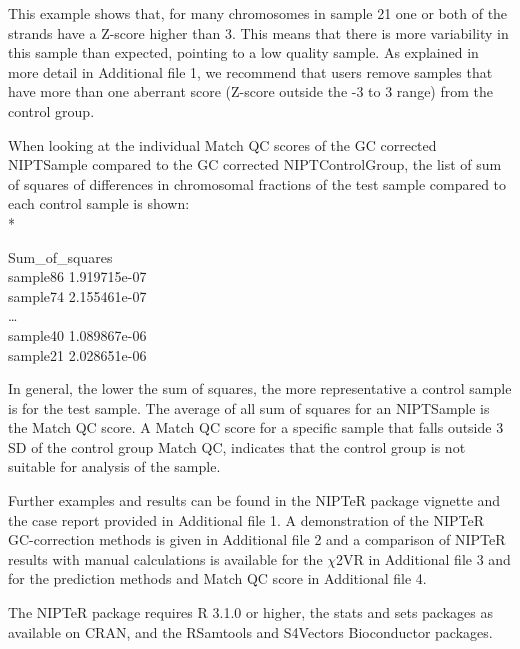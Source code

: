 This example shows that, for many chromosomes in sample 21 one or both of the strands have a Z-score higher than 3. 
This means that there is more variability in this sample than expected, pointing to a low quality sample. 
As explained in more detail in Additional file 1, we recommend that users remove samples that have more than one aberrant score (Z-score outside the -3 to 3 range) from the control group.

When looking at the individual Match QC scores of the GC corrected NIPTSample compared to the GC corrected NIPTControlGroup, the list of sum of squares of differences in chromosomal fractions of the test sample compared to each control sample is shown: \\*


\selectfont %
\footnotesize %
\noindent \hspace{16mm} Sum\_of\_squares \\
sample86 \hspace{1mm} 1.919715e-07 \\
sample74 \hspace{1mm} 2.155461e-07 \\
… \\
sample40 \hspace{1mm} 1.089867e-06 \\
sample21 \hspace{1mm} 2.028651e-06 \\
\selectfont %
\normalsize %


In general, the lower the sum of squares, the more representative a control sample is for the test sample. 
The average of all sum of squares for an NIPTSample is the Match QC score. 
A Match QC score for a specific sample that falls outside 3 SD of the control group Match QC, indicates that the control group is not suitable for analysis of the sample.

Further examples and results can be found in the NIPTeR package vignette \cite{Johansson_2016} and the case report provided in Additional file 1. 
A demonstration of the NIPTeR GC-correction methods is given in Additional file 2 and a comparison of NIPTeR results with manual calculations is available for the $\chi$2VR in Additional file 3 and for the prediction methods and Match QC score in Additional file 4.

The NIPTeR package requires R 3.1.0 or higher, the stats and sets packages as available on CRAN, and the RSamtools and S4Vectors Bioconductor packages.

